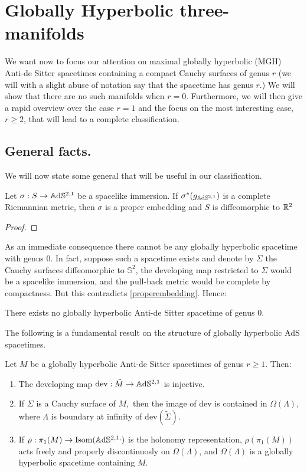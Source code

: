\section{Globally Hyperbolic three-manifolds}
We want now to focus our attention on maximal globally hyperbolic (MGH) Anti-de Sitter spacetimes containing a compact Cauchy surfaces of genus $r$ (we will with a slight abuse of notation say that the spacetime has genus $r$.) We will show that there are no such manifolds when $r=0$. Furthermore, we will then give a rapid overview over the case $r=1$ and the focus on the most interesting case, $r\geq 2$, that will lead to a complete classification.

\subsection{General facts.} We will now state some general that will be useful in our classification.

\begin{lemma}\label{properembedding}
    Let $\sigma:S\to\mathbb{A}\mathrm{d}\mathbb{S}^{2,1}$ be a spacelike immersion. If $\sigma^*(g_{\mathbb{A}\mathrm{d}\mathbb{S}^{2,1}})$ is a complete Riemannian metric, then $\sigma$ is a proper embedding and $S$ is diffeomorphic to $\mathbb{R}^2$
\end{lemma}
\begin{proof}
    
\end{proof}

As an immediate consequence there cannot be any globally hyperbolic spacetime with genus $0$. In fact, suppose such a spacetime exists and denote by $\Sigma$ the Cauchy surfaces diffeomorphic to $\mathbb{S}^2$, the developing map restricted to $\Sigma$ would be a spacelike immersion, and the pull-back metric would be complete by compactness. But this contradicts \ref{properembedding}. Hence: 

\begin{corollary}
    There exists no globally hyperbolic Anti-de Sitter spacetime of genus 0. 
\end{corollary}

The following is a fundamental result on the structure of globally hyperbolic AdS spacetimes.

\begin{proposition}\label{holorep}
    Let $M$ be a globally hyperbolic Anti-de Sitter spacetimes of genus $r\geq 1$. Then: 
    \begin{enumerate}
        \item The developing map $\text{dev}:\tilde{M}  \to  \mathbb{A}\mathrm{d}\mathbb{S}^{2,1}$ is injective. 
        \item If $\Sigma$ is a Cauchy surface of $M,$ then the image of dev is contained in $\Omega(\Lambda)$, where $\Lambda$ is boundary at infinity of $\text{dev}(\tilde{\Sigma}).$
        \item If $\rho:\pi_1(M)\to\text{Isom}(\mathbb{A}\mathrm{d}\mathbb{S}^{2,1,})$ is the holonomy representation, $\rho(\pi_1(M))$ acts freely and properly discontinuosly on $\Omega(\Lambda)$, and $\Omega(\Lambda)$ is a globally hyperbolic spacetime containing $M$. 
    \end{enumerate}
\end{proposition}

